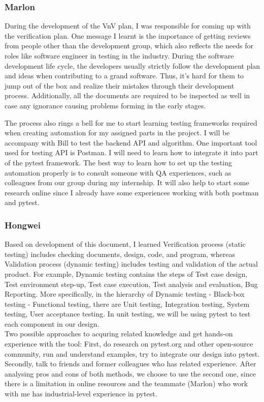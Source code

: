 \documentclass[12pt, titlepage]{article}
\begin{document}
\subsubsection{Marlon}
During the development of the VnV plan, I was responsible for coming up with the verification plan. One  message I learnt is the importance of getting reviews from people other than the development group, which also reflects the needs for roles like software engineer in testing in the industry. During the software development life cycle, the developers usually strictly follow the development plan and ideas when contributing to a grand software. Thus, it's hard for them to jump out of the box and realize their mistakes through their development process. Additionally, all the documents are required to be inspected as well in case any ignorance causing problems forming in the early stages. 

The process also rings a bell for me to start learning testing frameworks required when creating automation for my assigned parts in the project. I will be accompany with Bill to test the backend API and algorithm. One important tool used for testing API is Postman. I will need to learn how to integrate it into part of the pytest framework. The best way to learn how to set up the testing automation properly is to consult someone with QA experiences, such as colleagues from our group during my internship. It will also help to start some research online since I already have some experiences working with both postman and pytest.

\subsubsection{Hongwei}
Based on development of this document, I learned Verification process (static testing) includes checking documents, design, code, and program, whereas Validation process (dynamic testing) includes testing and validation of the actual product. For example, Dynamic testing contains the steps of Test case design, Test environment step-up, Test case execution, Test analysis and evaluation, Bug Reporting. More specifically, in the hierarchy of Dynamic testing - Black-box testing - Functional testing, there are Unit testing, Integration testing, System testing, User acceptance testing. In unit testing, we will be using pytest to test each component in our design.\\
\newline
Two possible approaches to acquring related knowledge and get hands-on experience with the tool: First, do research on pytest.org and other open-source community, run and understand examples, try to integrate our design into pytest. Secondly, talk to friends and former colleagues who has related experience. After analysing pros and cons of both methods, we choose to use the second one, since there is a limitation in online resources and the teammate (Marlon) who work with me has industrial-level experience in pytest.
\medskip
\end{document}
